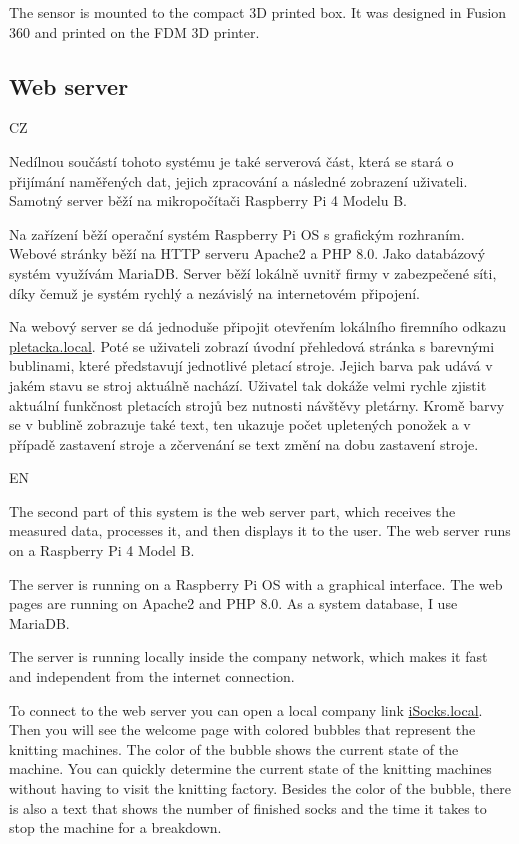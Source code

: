 \documentclass[12pt, a4paper]{article}
\begin{document}
The sensor is mounted to the compact 3D printed box.
It was designed in Fusion 360 and printed on the FDM 3D printer.

\subsection*{Web server}

CZ

Nedílnou součástí tohoto systému je také serverová část, která se stará o přijímání naměřených dat, jejich zpracování a následné zobrazení uživateli.
Samotný server běží na mikropočítači Raspberry Pi 4 Modelu B.

Na zařízení běží operační systém Raspberry Pi OS s grafickým rozhraním.
Webové stránky běží na HTTP serveru Apache2 a PHP 8.0.
Jako databázový systém využívám MariaDB.
Server běží lokálně uvnitř firmy v zabezpečené síti, díky čemuž je systém rychlý a nezávislý na internetovém připojení.

Na webový server se dá jednoduše připojit otevřením lokálního firemního odkazu \newline\href{http://pletacka.local}{pletacka.local}.
Poté se uživateli zobrazí úvodní přehledová stránka s barevnými bublinami, které představují jednotlivé pletací stroje.
Jejich barva pak udává v jakém stavu se stroj aktuálně nachází. Uživatel tak dokáže velmi rychle zjistit aktuální funkčnost pletacích strojů bez nutnosti návštěvy pletárny.
Kromě barvy se v bublině zobrazuje také text, ten ukazuje počet upletených ponožek a v případě zastavení stroje a zčervenání se text změní na dobu zastavení stroje.

EN

The second part of this system is the web server part, which receives the measured data, processes it, and then displays it to the user.
The web server runs on a Raspberry Pi 4 Model B.

The server is running on a Raspberry Pi OS with a graphical interface.
The web pages are running on Apache2 and PHP 8.0.
As a system database, I use MariaDB.

The server is running locally inside the company network, which makes it fast and independent from the internet connection.

To connect to the web server you can open a local company link \newline\href{http://iSocks.local}{iSocks.local}.
Then you will see the welcome page with colored bubbles that represent the knitting machines.
The color of the bubble shows the current state of the machine.
You can quickly determine the current state of the knitting machines without having to visit the knitting factory.
Besides the color of the bubble, there is also a text that shows the number of finished socks and the time it takes to stop the machine for a breakdown.
\end{document}
